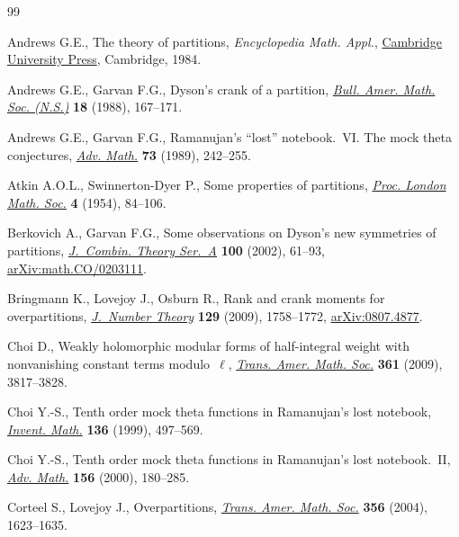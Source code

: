 \begin{thebibliography}{99}
\footnotesize\itemsep=0pt

Andrews G.E., The theory of partitions, \textit{Encyclopedia Math. Appl.}, \href{https://doi.org/10.1017/CBO9780511608650}{Cambridge University Press}, Cambridge, 1984.

Andrews G.E., Garvan F.G., Dyson's crank of a partition, \href{https://doi.org/10.1090/S0273-0979-1988-15637-6}{\textit{Bull. Amer.
  Math. Soc. (N.S.)}} \textbf{18} (1988), 167--171.

Andrews G.E., Garvan F.G., Ramanujan's ``lost'' notebook.~{VI}. {T}he mock
  theta conjectures, \href{https://doi.org/10.1016/0001-8708(89)90070-4}{\textit{Adv. Math.}} \textbf{73} (1989), 242--255.

Atkin A.O.L., Swinnerton-Dyer P., Some properties of partitions, \href{https://doi.org/10.1112/plms/s3-4.1.84}{\textit{Proc.
  London Math. Soc.}} \textbf{4} (1954), 84--106.

Berkovich A., Garvan F.G., Some observations on {D}yson's new symmetries of
  partitions, \href{https://doi.org/10.1006/jcta.2002.3281}{\textit{J.~Combin. Theory Ser.~A}} \textbf{100} (2002), 61--93,
  \href{https://arxiv.org/abs/math.CO/0203111}{arXiv:math.CO/0203111}.

Bringmann K., Lovejoy J., Osburn R., Rank and crank moments for overpartitions,
  \href{https://doi.org/10.1016/j.jnt.2008.10.017}{\textit{J.~Number Theory}} \textbf{129} (2009), 1758--1772,
  \href{https://arxiv.org/abs/0807.4877}{arXiv:0807.4877}.

Choi D., Weakly holomorphic modular forms of half-integral weight with
  nonvanishing constant terms modulo~$\ell$, \href{https://doi.org/10.1090/S0002-9947-09-04708-4}{\textit{Trans. Amer. Math. Soc.}}
  \textbf{361} (2009), 3817--3828.

Choi Y.-S., Tenth order mock theta functions in {R}amanujan's lost notebook,
  \href{https://doi.org/10.1007/s002220050318}{\textit{Invent. Math.}} \textbf{136} (1999), 497--569.

Choi Y.-S., Tenth order mock theta functions in {R}amanujan's lost
  notebook.~{II}, \href{https://doi.org/10.1006/aima.2000.1948}{\textit{Adv. Math.}} \textbf{156} (2000), 180--285.

Corteel S., Lovejoy J., Overpartitions, \href{https://doi.org/10.1090/S0002-9947-03-03328-2}{\textit{Trans. Amer. Math. Soc.}}
  \textbf{356} (2004), 1623--1635.


\end{thebibliography}
